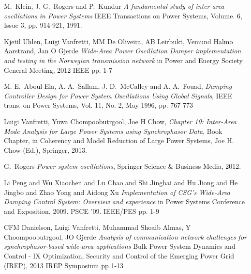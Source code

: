 \documentclass[journal]{IEEEtran}
\begin{document}
%
%
%
\begin{thebibliography}{1}

M.~Klein, J. G.~Rogers and P.~Kundur \emph{A fundamental study of inter-area oscillations in Power Systems}  IEEE Transactions on Power Systems, Volume. 6, Issue 3, pp. 914-921, 1991. 

 Kjetil Uhlen, Luigi Vanfretti, MM De Oliveira, AB Leirbukt, Vemund Halmo Aarstrand, Jan O Gjerde \emph{Wide-Area Power Oscillation Damper implementation and testing in the Norwegian transmission network} in Power and Energy Society General Meeting, 2012 IEEE pp. 1-7

  M. E.~Aboul-Ela, A. A.~Sallam, J. D.~McCalley and A. A.~Fouad, \emph{Damping Controller Design for Power System Oscillations Using Global Signals}, IEEE trans. on Power Systems, Vol. 11, No. 2, May 1996, pp. 767-773

  Luigi Vanfretti, Yuwa Chompoobutrgool, Joe H Chow, \emph{Chapter 10: Inter-Area Mode Analysis for Large Power Systems using Synchrophasor Data}, Book Chapter, in Coherency and Model Reduction of Large Power Systems, Joe H. Chow (Ed.), Springer, 2013.

 G.~Rogers \emph{Power system oscillations}, Springer Science \& Business Media, 2012. 

 Li Peng and Wu Xiaochen and Lu Chao and Shi Jinghai and Hu Jiong and He Jingbo and Zhao Yong and Aidong Xu \emph{Implementation of CSG's Wide-Area Damping Control System: Overview and experience} in Power Systems Conference and Exposition, 2009. PSCE '09. IEEE/PES pp. 1-9

 CFM Danielson, Luigi Vanfretti, Muhammad Shoaib Almas, Y Choompoobutrgool, JO Gjerde \emph{Analysis of communication network challenges for synchrophasor-based wide-area applications} Bulk Power System Dynamics and Control - IX Optimization, Security and Control of the Emerging Power Grid (IREP), 2013 IREP Symposium pp 1-13


\end{thebibliography}
\end{document}
